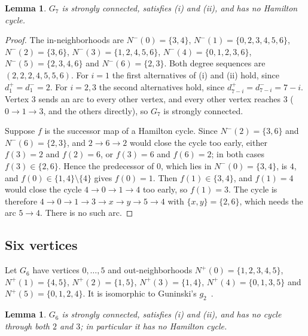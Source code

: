 \documentclass[11pt]{article}
\newtheorem{lemma}[theorem]{Lemma}
\begin{document}
\begin{lemma}\label{lem:G7}
$G_7$ is strongly connected, satisfies (i) and (ii), and has no Hamilton cycle.
\end{lemma}

\begin{proof}
The in-neighborhoods are $N^-(0)=\{3,4\}$, $N^-(1)=\{0,2,3,4,5,6\}$, $N^-(2)=\{3,6\}$, $N^-(3)=\{1,2,4,5,6\}$, $N^-(4)=\{0,1,2,3,6\}$, $N^-(5)=\{2,3,4,6\}$ and $N^-(6)=\{2,3\}$. Both degree sequences are $(2,2,2,4,5,5,6)$. For $i=1$ the first alternatives of (i) and (ii) hold, since $d^+_1=d^-_1=2$. For $i=2,3$ the second alternatives hold, since $d^+_{7-i}=d^-_{7-i}=7-i$. Vertex $3$ sends an arc to every other vertex, and every other vertex reaches $3$ ($0\to1\to3$, and the others directly), so $G_7$ is strongly connected.

Suppose $f$ is the successor map of a Hamilton cycle. Since $N^-(2)=\{3,6\}$ and $N^-(6)=\{2,3\}$, and $2\to6\to2$ would close the cycle too early, either $f(3)=2$ and $f(2)=6$, or $f(3)=6$ and $f(6)=2$; in both cases $f(3)\in\{2,6\}$. Hence the predecessor of $0$, which lies in $N^-(0)=\{3,4\}$, is $4$, and $f(0)\in\{1,4\}\setminus\{4\}$ gives $f(0)=1$. Then $f(1)\in\{3,4\}$, and $f(1)=4$ would close the cycle $4\to0\to1\to4$ too early, so $f(1)=3$. The cycle is therefore $4\to0\to1\to3\to x\to y\to5\to4$ with $\{x,y\}=\{2,6\}$, which needs the arc $5\to4$. There is no such arc.
\end{proof}

\subsection{Six vertices}
Let $G_6$ have vertices $0,\dots,5$ and out-neighborhoods $N^+(0)=\{1,2,3,4,5\}$, $N^+(1)=\{4,5\}$, $N^+(2)=\{1,5\}$, $N^+(3)=\{1,4\}$, $N^+(4)=\{0,1,3,5\}$ and $N^+(5)=\{0,1,2,4\}$. It is isomorphic to Guninski's $g_2$~\cite{Gu20}.

\begin{lemma}\label{lem:G6}
$G_6$ is strongly connected, satisfies (i) and (ii), and has no cycle through both $2$ and $3$; in particular it has no Hamilton cycle.
\end{lemma}
\end{document}
